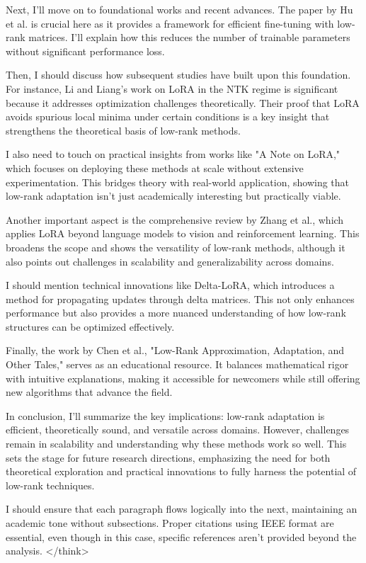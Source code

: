 \documentclass[conference]{IEEEtran}
\begin{document}
Next, I'll move on to foundational works and recent advances. The paper by Hu et al. is crucial here as it provides a framework for efficient fine-tuning with low-rank matrices. I'll explain how this reduces the number of trainable parameters without significant performance loss.

Then, I should discuss how subsequent studies have built upon this foundation. For instance, Li and Liang's work on LoRA in the NTK regime is significant because it addresses optimization challenges theoretically. Their proof that LoRA avoids spurious local minima under certain conditions is a key insight that strengthens the theoretical basis of low-rank methods.

I also need to touch on practical insights from works like "A Note on LoRA," which focuses on deploying these methods at scale without extensive experimentation. This bridges theory with real-world application, showing that low-rank adaptation isn't just academically interesting but practically viable.

Another important aspect is the comprehensive review by Zhang et al., which applies LoRA beyond language models to vision and reinforcement learning. This broadens the scope and shows the versatility of low-rank methods, although it also points out challenges in scalability and generalizability across domains.

I should mention technical innovations like Delta-LoRA, which introduces a method for propagating updates through delta matrices. This not only enhances performance but also provides a more nuanced understanding of how low-rank structures can be optimized effectively.

Finally, the work by Chen et al., "Low-Rank Approximation, Adaptation, and Other Tales," serves as an educational resource. It balances mathematical rigor with intuitive explanations, making it accessible for newcomers while still offering new algorithms that advance the field.

In conclusion, I'll summarize the key implications: low-rank adaptation is efficient, theoretically sound, and versatile across domains. However, challenges remain in scalability and understanding why these methods work so well. This sets the stage for future research directions, emphasizing the need for both theoretical exploration and practical innovations to fully harness the potential of low-rank techniques.

I should ensure that each paragraph flows logically into the next, maintaining an academic tone without subsections. Proper citations using IEEE format are essential, even though in this case, specific references aren't provided beyond the analysis.
</think>
\end{document}
